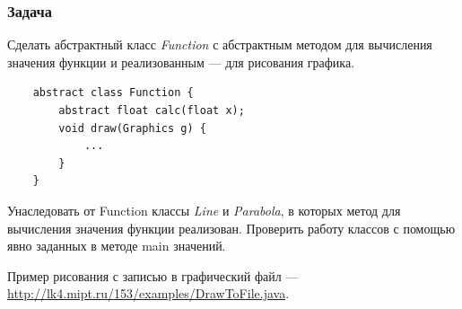 \begin{frame}[fragile]
	\frametitle{Задача}

	Сделать абстрактный класс \emph{Function} с абстрактным методом для вычисления значения функции и реализованным --- для рисования графика.
	\begin{verbatim}
	abstract class Function {
	    abstract float calc(float x);
	    void draw(Graphics g) {
	        ...
	    }
	}
	\end{verbatim}

	Унаследовать от Function классы \emph{Line} и \emph{Parabola}, в которых метод для вычисления значения функции реализован.
	Проверить работу классов с помощью явно заданных в методе main значений.

	Пример рисования с записью в графический файл --- \href{http://lk4.mipt.ru/153/examples/DrawToFile.java}{http://lk4.mipt.ru/153/examples/DrawToFile.java}.
\end{frame}
